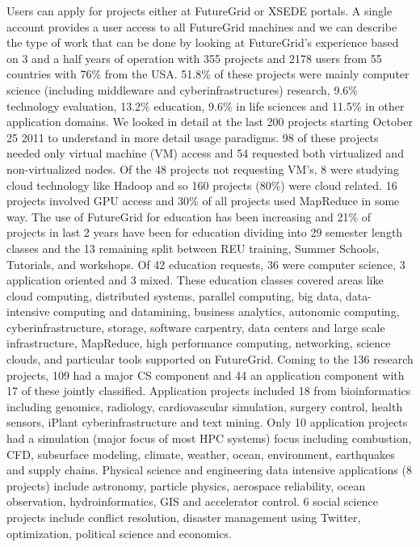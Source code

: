 Users can apply for projects either at FutureGrid or XSEDE portals. A single account provides a user access to all FutureGrid machines and we can describe the type of work that can be done by looking at FutureGrid’s experience based on 3 and a half years of operation with 355 projects and 2178 users from 55 countries with 76\% from the USA. 51.8\% of these projects were mainly computer science (including middleware and cyberinfrastructures) research, 9.6\% technology evaluation, 13.2\% education, 9.6\% in life sciences and 11.5\% in other application domains. We looked in detail at the last 200 projects starting October 25 2011 to understand in more detail usage paradigms. 98 of these projects needed only virtual machine (VM) access and 54 requested both virtualized and non-virtualized nodes. Of the 48 projects not requesting VM’s, 8 were studying cloud technology like Hadoop and so 160 projects (80\%) were cloud related. 16 projects involved GPU access and 30\% of all projects used MapReduce in some way. The use of FutureGrid for education has been increasing and 21\% of projects in last 2 years have been for education dividing into 29 semester length classes and the 13 remaining split between REU training, Summer Schools, Tutorials, and workshops. Of 42 education requests, 36 were computer science, 3 application oriented and 3 mixed. These education classes covered areas like cloud computing, distributed systems, parallel computing, big data, data-intensive computing and datamining, business analytics, autonomic computing, cyberinfrastructure, storage, software carpentry, data centers and large scale infrastructure, MapReduce, high performance computing, networking, science clouds, and particular tools supported on FutureGrid.
Coming to the 136 research projects, 109 had a major CS component and 44 an application component with 17 of these jointly classified. Application projects included 18 from bioinformatics including genomics, radiology, cardiovascular simulation, surgery control, health sensors, iPlant cyberinfrastructure and text mining. Only 10 application projects had a simulation (major focus of most HPC systems) focus including combustion, CFD, subsurface modeling, climate, weather, ocean, environment, earthquakes and supply chains. Physical science and engineering data intensive applications (8 projects) include astronomy, particle physics, aerospace reliability, ocean observation, hydroinformatics, GIS and accelerator control. 6 social science projects include conflict resolution, disaster management using Twitter, optimization, political science and economics.

